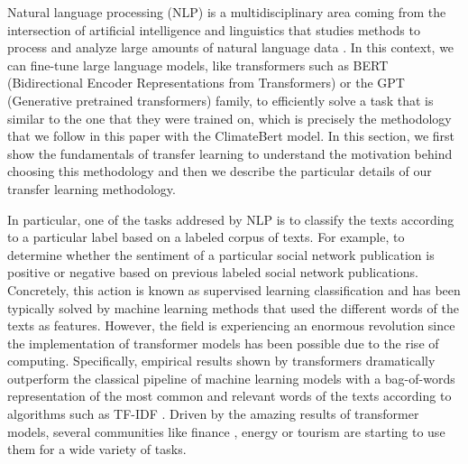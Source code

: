 \documentclass[runningheads]{llncs}
\begin{document}
Natural language processing (NLP) is a multidisciplinary area coming from the intersection of artificial intelligence and linguistics that studies methods to process and analyze large amounts of natural language data \cite{nadkarni2011natural}. In this context, we can fine-tune large language models, like transformers such as BERT (Bidirectional Encoder Representations from Transformers) or the GPT (Generative pretrained transformers) family, to efficiently solve a task that is similar to the one that they were trained on, which is precisely the methodology that we follow in this paper with the ClimateBert model. In this section, we first show the fundamentals of transfer learning to understand the motivation behind choosing this methodology and then we describe the particular details of our transfer learning methodology.  

In particular, one of the tasks addresed by NLP is to classify the texts according to a particular label based on a labeled corpus of texts. For example, to determine whether the sentiment of a particular social network publication is positive or negative based on previous labeled social network publications. Concretely, this action is known as supervised learning classification \cite{murphy2012machine} and has been typically solved by machine learning methods that used the different words of the texts as features. However, the field is experiencing an enormous revolution since the implementation of transformer models has been possible due to the rise of computing. Specifically, empirical results shown by transformers dramatically outperform the classical pipeline of machine learning models with a bag-of-words representation of the most common and relevant words of the texts according to algorithms such as TF-IDF \cite{gonzalez2020comparing}. Driven by the amazing results of transformer models, several communities like finance \cite{zhao2021bert}, energy \cite{cai2020sentiment} or tourism \cite{chantrapornchai2021information} are starting to use them for a wide variety of tasks.  
\end{document}
